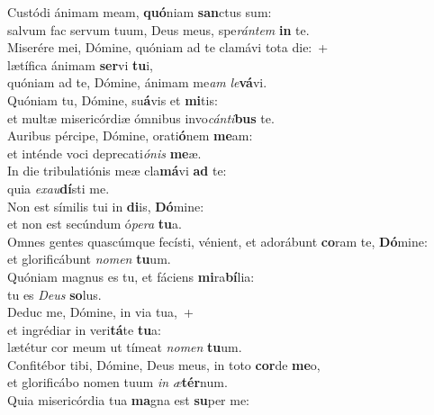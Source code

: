 \evenverse Custódi ánimam meam, \textbf{quó}niam \textbf{san}ctus sum:~\*\\
\evenverse salvum fac servum tuum, Deus meus, spe\textit{rán}\textit{tem} \textbf{in} te.\\
\oddverse Miserére mei, Dómine, quóniam ad te clamávi tota die:~+\\
\oddverse  lætífica ánimam \textbf{ser}vi \textbf{tu}i,~\*\\
\oddverse quóniam ad te, Dómine, ánimam me\textit{am} \textit{le}\textbf{vá}vi.\\
\evenverse Quóniam tu, Dómine, su\textbf{á}vis et \textbf{mi}tis:~\*\\
\evenverse et multæ misericórdiæ ómnibus invo\textit{cán}\textit{ti}\textbf{bus} te.\\
\oddverse Auribus pércipe, Dómine, orati\textbf{ó}nem \textbf{me}am:~\*\\
\oddverse et inténde voci deprecati\textit{ó}\textit{nis} \textbf{me}æ.\\
\evenverse In die tribulatiónis meæ cla\textbf{má}vi \textbf{ad} te:~\*\\
\evenverse quia \textit{e}\textit{xau}\textbf{dí}sti me.\\
\oddverse Non est símilis tui in \textbf{di}is, \textbf{Dó}mine:~\*\\
\oddverse et non est secúndum ó\textit{pe}\textit{ra} \textbf{tu}a.\\
\evenverse Omnes gentes quascúmque fecísti, vénient, et adorábunt \textbf{co}ram te, \textbf{Dó}mine:~\*\\
\evenverse et glorificábunt \textit{no}\textit{men} \textbf{tu}um.\\
\oddverse Quóniam magnus es tu, et fáciens \textbf{mi}ra\textbf{bí}lia:~\*\\
\oddverse tu es \textit{De}\textit{us} \textbf{so}lus.\\
\evenverse Deduc me, Dómine, in via tua,~+\\
\evenverse  et ingrédiar in veri\textbf{tá}te \textbf{tu}a:~\*\\
\evenverse lætétur cor meum ut tímeat \textit{no}\textit{men} \textbf{tu}um.\\
\oddverse Confitébor tibi, Dómine, Deus meus, in toto \textbf{cor}de \textbf{me}o,~\*\\
\oddverse et glorificábo nomen tuum \textit{in} \textit{æ}\textbf{tér}num.\\
\evenverse Quia misericórdia tua \textbf{ma}gna est \textbf{su}per me:~\*\\
